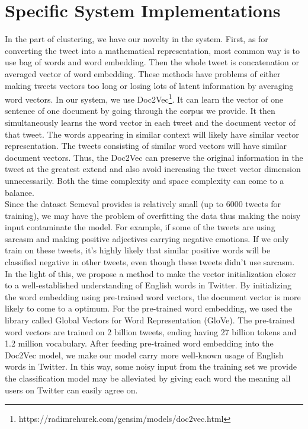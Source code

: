 \documentclass[conference]{IEEEtran}
\begin{document}
\section{Specific System Implementations}
In the part of clustering, we have our novelty in the system. First, as for converting the tweet into a mathematical representation, most common way is to use bag of words and word embedding. Then the whole tweet is concatenation or averaged vector of word embedding. These methods have problems of either making tweets vectors too long or losing lots of latent information by averaging word vectors. In our system, we use Doc2Vec\footnote{https://radimrehurek.com/gensim/models/doc2vec.html}. It can learn the vector of one sentence of one document by going through the corpus we provide. It then simultaneously learns the word vector in each tweet and the document vector of that tweet. The words appearing in similar context will likely have similar vector representation. The tweets consisting of similar word vectors will have similar document vectors. Thus, the Doc2Vec can preserve the original information in the tweet at the greatest extend and also avoid increasing the tweet vector dimension unnecessarily. Both the time complexity and space complexity can come to a balance.
\\ \indent
Since the dataset Semeval provides is relatively small (up to 6000 tweets for training), we may have the problem of overfitting the data thus making the noisy input contaminate the model. For example, if some of the tweets are using sarcasm and making positive adjectives carrying negative emotions. If we only train on these tweets, it's highly likely that similar positive words will be classified negative in other tweets, even though these tweets didn't use sarcasm. In the light of this, we propose a method to make the vector initialization closer to a well-established understanding of English words in Twitter. By initializing the word embedding using pre-trained word vectors, the document vector is more likely to come to a optimum. For the pre-trained word embedding, we used the library called Global Vectors for Word Representation (GloVe). The pre-trained word vectors are trained on 2 billion tweets, ending having 27 billion tokens and 1.2 million vocabulary. After feeding pre-trained word embedding into the Doc2Vec model, we make our model carry more well-known usage of English words in Twitter. In this way, some noisy input from the training set we provide the classification model may be alleviated by giving each word the meaning all users on Twitter can easily agree on.
\end{document}
